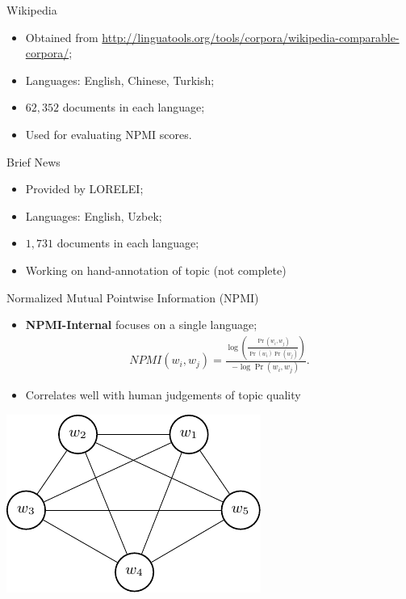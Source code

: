 \documentclass[compress]{beamer}
\begin{document}
	\begin{frame}{Wikipedia}
		\begin{itemize}
			\item Obtained from \url{http://linguatools.org/tools/corpora/wikipedia-comparable-corpora/};
			\item Languages: English, Chinese, Turkish;
			\item $62,352$ documents in each language;
			\item Used for evaluating NPMI scores.
		\end{itemize}
	\end{frame}

	\begin{frame}{Brief News}
		\begin{itemize}
			\item Provided by LORELEI;
			\item Languages: English, Uzbek;
			\item $1,731$ documents in each language;
			\item Working on hand-annotation of topic (not complete)
		\end{itemize}
	\end{frame}
	

		\begin{frame}{Normalized Mutual Pointwise Information (NPMI)}
			\begin{itemize}
				\item \textbf{NPMI-Internal} focuses on a single language;
					\begin{align}
					NPMI(w_i,w_j)=\frac{\log\left(\frac{\Pr(w_i,w_j)}{\Pr(w_i)\Pr(w_j)}\right)}{-\log\Pr(w_i,w_j)}.
					\end{align}
			\item Correlates well with human judgements of
                          topic quality
			\end{itemize}
			\begin{center}
				\includegraphics[height=0.3\textheight]{multilingual_itm/npmi-internal.pdf}
			\end{center}
		\end{frame}
\end{document}
